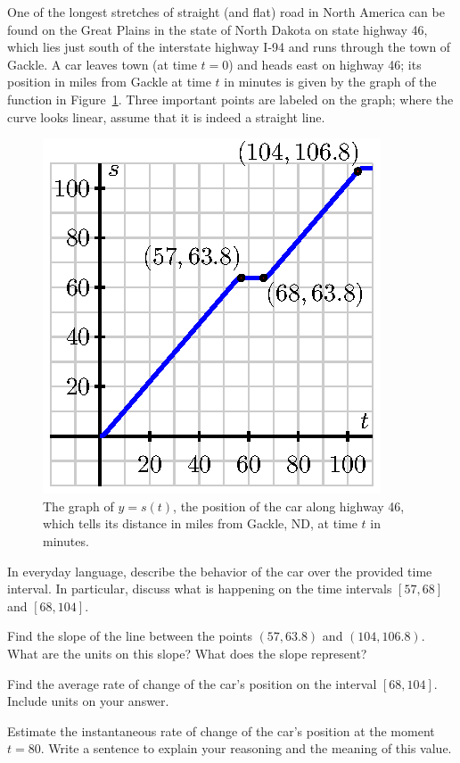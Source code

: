 \begin{pa} \label{PA:1.5}
One of the longest stretches of straight (and flat) road in North America can be found on the Great Plains in the state of North Dakota on state highway 46, which lies just south of the interstate highway I-94 and runs through the town of Gackle.  A car leaves town (at time $t = 0$) and heads east on highway 46; its position in miles from Gackle at time $t$ in minutes is given by the graph of the function in Figure~\ref{F:1.5.PA1}.  Three important points are labeled on the graph; where the curve looks linear, assume that it is indeed a straight line.
\begin{figure}[h]
\begin{center}
\includegraphics{figures/1_5_PA1.eps}
\caption{The graph of $y = s(t)$, the position of the car along highway 46, which tells its distance in miles from Gackle, ND, at time $t$ in minutes.} \label{F:1.5.PA1}
\end{center}
\end{figure}
\ba
	\item In everyday language, describe the behavior of the car over the provided time interval.  In particular, discuss what is happening on the time intervals $[57,68]$ and $[68,104]$.
	\item Find the slope of the line between the points $(57,63.8)$ and $(104,106.8)$.  What are the units on this slope?  What does the slope represent?
	\item Find the average rate of change of the car's position on the interval $[68,104]$.  Include units on your answer.
	\item Estimate the instantaneous rate of change of the car's position at the moment $t = 80$.  Write a sentence to explain your reasoning and the meaning of this value.
\ea
\end{pa} \afterpa

